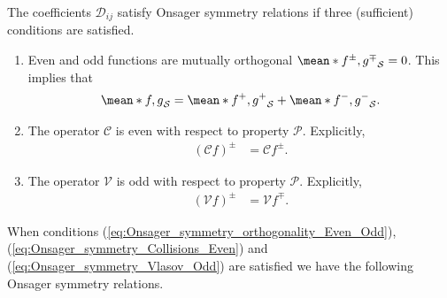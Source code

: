 The coefficients $\mathcal{D}_{ij}$ satisfy Onsager symmetry relations if three (sufficient) conditions are satisfied. 
%
\begin{enumerate}
	\item Even and odd functions are mutually orthogonal $\mean*{f^\pm, g^\mp}_\mathcal{S}=0$. This implies that
	\begin{align}
		\mean*{f,g}_{\mathcal{S}} = \mean*{f^+,g^+}_{\mathcal{S}} + \mean*{f^-,g^-}_{\mathcal{S}}.
		\label{eq:Onsager_symmetry_orthogonality_Even_Odd}
	\end{align}

    \item The operator $\mathcal{C}$ is even with respect to property $\mathcal{P}$. Explicitly,
    \begin{align}
    	(\mathcal{C} f)^\pm & = \mathcal{C} f^\pm.
    	\label{eq:Onsager_symmetry_Collisions_Even}
    \end{align}
    
    \item The operator $\mathcal{V}$ is odd with respect to property $\mathcal{P}$. Explicitly,
    \begin{align}
    	(\mathcal{V} f)^\pm & = \mathcal{V} f^\mp.
    	\label{eq:Onsager_symmetry_Vlasov_Odd}
    \end{align}
\end{enumerate}
When conditions (\ref{eq:Onsager_symmetry_orthogonality_Even_Odd}), (\ref{eq:Onsager_symmetry_Collisions_Even}) and (\ref{eq:Onsager_symmetry_Vlasov_Odd}) are satisfied we have the following Onsager symmetry relations.
%
